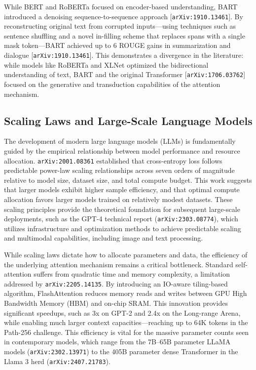 \documentclass[11pt]{article}
\begin{document}
While BERT and RoBERTa focused on encoder-based understanding, BART introduced a denoising sequence-to-sequence approach [\texttt{arXiv:1910.13461}]. By reconstructing original text from corrupted inputs—using techniques such as sentence shuffling and a novel in-filling scheme that replaces spans with a single mask token—BART achieved up to 6 ROUGE gains in summarization and dialogue [\texttt{arXiv:1910.13461}]. This demonstrates a divergence in the literature: while models like RoBERTa and XLNet optimized the bidirectional understanding of text, BART and the original Transformer [\texttt{arXiv:1706.03762}] focused on the generative and transduction capabilities of the attention mechanism.

\subsection{Scaling Laws and Large-Scale Language Models}

The development of modern large language models (LLMs) is fundamentally guided by the empirical relationship between model performance and resource allocation. \texttt{arXiv:2001.08361} established that cross-entropy loss follows predictable power-law scaling relationships across seven orders of magnitude relative to model size, dataset size, and total compute budget. This work suggests that larger models exhibit higher sample efficiency, and that optimal compute allocation favors larger models trained on relatively modest datasets. These scaling principles provide the theoretical foundation for subsequent large-scale deployments, such as the GPT-4 technical report (\texttt{arXiv:2303.08774}), which utilizes infrastructure and optimization methods to achieve predictable scaling and multimodal capabilities, including image and text processing.

While scaling laws dictate how to allocate parameters and data, the efficiency of the underlying attention mechanism remains a critical bottleneck. Standard self-attention suffers from quadratic time and memory complexity, a limitation addressed by \texttt{arXiv:2205.14135}. By introducing an IO-aware tiling-based algorithm, FlashAttention reduces memory reads and writes between GPU High Bandwidth Memory (HBM) and on-chip SRAM. This innovation provides significant speedups, such as 3x on GPT-2 and 2.4x on the Long-range Arena, while enabling much larger context capacities—reaching up to 64K tokens in the Path-256 challenge. This efficiency is vital for the massive parameter counts seen in contemporary models, which range from the 7B–65B parameter LLaMA models (\texttt{arXiv:2302.13971}) to the 405B parameter dense Transformer in the Llama 3 herd (\texttt{arXiv:2407.21783}).
\end{document}
